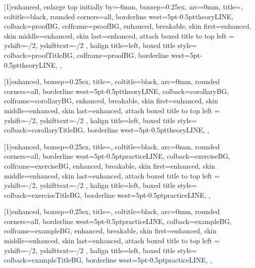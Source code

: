 [1]{enhanced,
    enlarge top initially by=-6mm,
    boxsep=0.25ex,
    arc=0mm,
    title=,
    coltitle=black,
    rounded corners=all,
    borderline west={5pt}{-0.5pt}{theoryLINE},
    colback=proofBG,
    colframe=proofBG,
    enhanced,
    breakable,
    skin first=enhanced,
    skin middle=enhanced,
    skin last=enhanced,
    attach boxed title to top left ={
        yshift=-\tcboxedtitleheight/2,
        yshifttext=-\tcboxedtitleheight/2
    },
    halign title=left,
    boxed title style={
        colback=proofTitleBG,
        colframe=proofBG,
        borderline west={5pt}{-0.5pt}{theoryLINE},
    },
}

[1]{enhanced,
    boxsep=0.25ex,
    title=,
    coltitle=black,
    arc=0mm,
    rounded corners=all,
    borderline west={5pt}{-0.5pt}{theoryLINE},
    colback=corollaryBG,
    colframe=corollaryBG,
    enhanced,
    breakable,
    skin first=enhanced,
    skin middle=enhanced,
    skin last=enhanced,
    attach boxed title to top left ={
        yshift=-\tcboxedtitleheight/2,
        yshifttext=-\tcboxedtitleheight/2
    },
    halign title=left,
    boxed title style={
        colback=corollaryTitleBG,
        borderline west={5pt}{-0.5pt}{theoryLINE},
    },
}

[1]{enhanced,
    boxsep=0.25ex,
    title=,
    coltitle=black,
    arc=0mm,
    rounded corners=all,
    borderline west={5pt}{-0.5pt}{practiceLINE},
    colback=exerciseBG,
    colframe=exerciseBG,
    enhanced,
    breakable,
    skin first=enhanced,
    skin middle=enhanced,
    skin last=enhanced,
    attach boxed title to top left ={
        yshift=-\tcboxedtitleheight/2,
        yshifttext=-\tcboxedtitleheight/2
    },
    halign title=left,
    boxed title style={
        colback=exerciseTitleBG,
        borderline west={5pt}{-0.5pt}{practiceLINE},
    },
}

[1]{enhanced,
    boxsep=0.25ex,
    title=,
    coltitle=black,
    arc=0mm,
    rounded corners=all,
    borderline west={5pt}{-0.5pt}{practiceLINE},
    colback=exampleBG,
    colframe=exampleBG,
    enhanced,
    breakable,
    skin first=enhanced,
    skin middle=enhanced,
    skin last=enhanced,
    attach boxed title to top left ={
        yshift=-\tcboxedtitleheight/2,
        yshifttext=-\tcboxedtitleheight/2
    },
    halign title=left,
    boxed title style={
        colback=exampleTitleBG,
        borderline west={5pt}{-0.5pt}{practiceLINE},
    },
}

